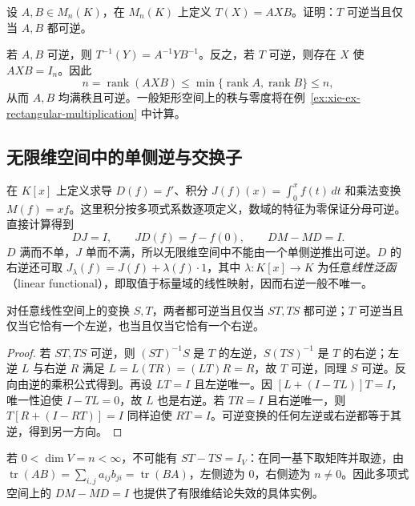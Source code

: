 \begin{example}
\label{ex:xie-ex-two-sided-multiplication}
设 $A,B\in M_n(K)$，在 $M_n(K)$ 上定义 $T(X)=AXB$。证明：$T$ 可逆当且仅当 $A,B$ 都可逆。
\end{example}

\begin{solve}
若 $A,B$ 可逆，则 $T^{-1}(Y)=A^{-1}YB^{-1}$。反之，若 $T$ 可逆，则存在 $X$ 使 $AXB=I_n$。因此
\[
    n=\operatorname{rank}(AXB)
    \leq\min\{\operatorname{rank}A,\operatorname{rank}B\}\leq n,
\]
从而 $A,B$ 均满秩且可逆。一般矩形空间上的秩与零度将在例~\ref{ex:xie-ex-rectangular-multiplication} 中计算。
\end{solve}

\subsection{无限维空间中的单侧逆与交换子}

在 $K[x]$ 上定义求导 $D(f)=f'$、积分 $J(f)(x)=\int_0^x f(t)\,dt$ 和乘法变换 $M(f)=xf$。这里积分按多项式系数逐项定义，数域的特征为零保证分母可逆。直接计算得到
\[
    DJ=I,\qquad JD(f)=f-f(0),\qquad DM-MD=I.
\]
$D$ 满而不单，$J$ 单而不满，所以无限维空间中不能由一个单侧逆推出可逆。$D$ 的右逆还可取 $J_\lambda(f)=J(f)+\lambda(f)\cdot1$，其中 $\lambda:K[x]\to K$ 为任意\emph{线性泛函}（linear functional），即取值于标量域的线性映射，因而右逆一般不唯一。

\begin{proposition}
\label{prop:xie-ex-infinite-inverse-criteria}
对任意线性空间上的变换 $S,T$，两者都可逆当且仅当 $ST,TS$ 都可逆；$T$ 可逆当且仅当它恰有一个左逆，也当且仅当它恰有一个右逆。
\end{proposition}

\begin{proof}
若 $ST,TS$ 可逆，则 $(ST)^{-1}S$ 是 $T$ 的左逆，$S(TS)^{-1}$ 是 $T$ 的右逆；左逆 $L$ 与右逆 $R$ 满足 $L=L(TR)=(LT)R=R$，故 $T$ 可逆，同理 $S$ 可逆。反向由逆的乘积公式得到。再设 $LT=I$ 且左逆唯一。因 $[L+(I-TL)]T=I$，唯一性迫使 $I-TL=0$，故 $L$ 也是右逆。若 $TR=I$ 且右逆唯一，则 $T[R+(I-RT)]=I$ 同样迫使 $RT=I$。可逆变换的任何左逆或右逆都等于其逆，得到另一方向。
\end{proof}

若 $0<\dim V=n<\infty$，不可能有 $ST-TS=I_V$：在同一基下取矩阵并取迹，由 $\operatorname{tr}(AB)=\sum_{i,j}a_{ij}b_{ji}=\operatorname{tr}(BA)$，左侧迹为 $0$，右侧迹为 $n\ne0$。因此多项式空间上的 $DM-MD=I$ 也提供了有限维结论失效的具体实例。

